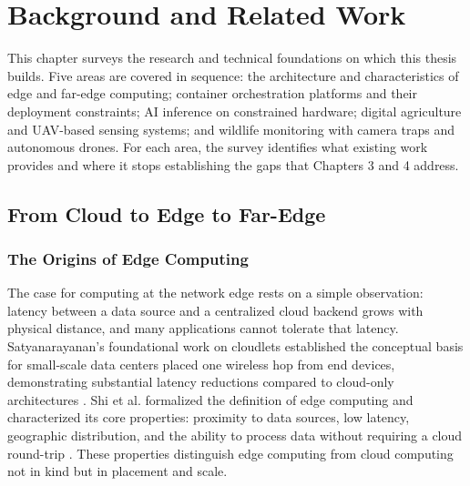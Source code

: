 
\chapter{Background and Related Work}
\label{ch:background_and_related_work}

This chapter surveys the research and technical foundations on which this thesis builds. Five areas are covered in sequence: the architecture and characteristics of edge and far-edge computing; container orchestration platforms and their deployment constraints; AI inference on constrained hardware; digital agriculture and UAV-based sensing systems; and wildlife monitoring with camera traps and autonomous drones. For each area, the survey identifies what existing work provides and where it stops establishing the gaps that Chapters 3 and 4 address.

\section{From Cloud to Edge to Far-Edge}
\label{sec:bg_cloud_edge}
\subsection{The Origins of Edge Computing}
\label{sec:origin}
The case for computing at the network edge rests on a simple observation: latency between a data source and a centralized cloud backend grows with physical distance, and many applications cannot tolerate that latency. Satyanarayanan's foundational work on cloudlets established the conceptual basis for small-scale data centers placed one wireless hop from end devices, demonstrating substantial latency reductions compared to cloud-only architectures \cite{satyanarayanan2017emergence}. Shi et al. formalized the definition of edge computing and characterized its core properties: proximity to data sources, low latency, geographic distribution, and the ability to process data without requiring a cloud round-trip \cite{shi2016edge}. These properties distinguish edge computing from cloud computing not in kind but in placement and scale.

